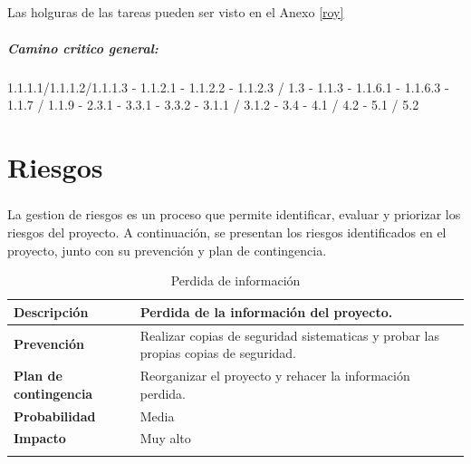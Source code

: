 \documentclass{report}
\begin{document}
        \paragraph*{}{
            Las holguras de las tareas pueden ser visto en el Anexo \ref{roy}
        }
        \paragraph*{Camino critico general: }{1.1.1.1/1.1.1.2/1.1.1.3 - 1.1.2.1 - 1.1.2.2 - 1.1.2.3 / 1.3 - 1.1.3 - 1.1.6.1 - 1.1.6.3 - 1.1.7 / 1.1.9 - 2.3.1 - 3.3.1 - 3.3.2 - 3.1.1 / 3.1.2 - 3.4 - 4.1 / 4.2 - 5.1 / 5.2}
    \chapter{Riesgos}
        \paragraph*{}{
            La gestion de riesgos es un proceso que permite identificar, evaluar y priorizar los riesgos del proyecto. A continuación, se presentan los riesgos identificados en el proyecto, junto con su prevención y plan de contingencia.
        }
        \begin{center}
            \begin{longtable}{|p{6cm}|p{6cm}|}
                \hline
                \textbf{Descripción} & Perdida de la información del proyecto.\\
                \hline
                \textbf{Prevención} & Realizar copias de seguridad sistematicas y probar las propias copias de seguridad.\\
                \hline
                \textbf{Plan de contingencia} & Reorganizar el proyecto y rehacer la información perdida.\\
                \hline
                \textbf{Probabilidad} & Media\\
                \hline
                \textbf{Impacto} & Muy alto\\
                \hline
                \caption{Perdida de información}
            \end{longtable}
        \end{center}
\end{document}
